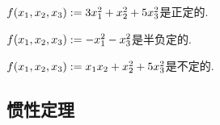 \begin{example}
\(f(x_1,x_2,x_3) := 3 x_1^2 + x_2^2 + 5 x_3^2\)是正定的.
\end{example}

\begin{example}
\(f(x_1,x_2,x_3) := -x_1^2 - x_3^2\)是半负定的.
\end{example}

\begin{example}
\(f(x_1,x_2,x_3) := x_1 x_2 + x_2^2 + 5 x_3^2\)是不定的.
\end{example}

\subsection{惯性定理}
